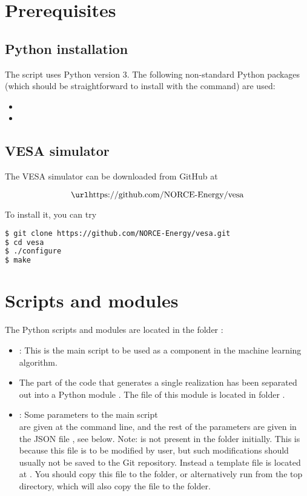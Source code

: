 \documentclass[11pt,a4paper]{amsart}
\begin{document}
\section{Prerequisites}
\subsection{Python installation}
The script uses Python version 3.
The following non-standard Python
packages (which should be straightforward to install with the \pythonPip{} 
\cite{pyt18:pip} command) are used:
\begin{itemize}
\item {}
\item {}
\end{itemize}
\subsection{VESA simulator}
The VESA simulator can be downloaded from GitHub at

\[ \text{\vesaGitHub{}} \]

To install it, you can try
\begin{lstlisting}[language=bash]
$ git clone https://github.com/NORCE-Energy/vesa.git
$ cd vesa
$ ./configure
$ make
\end{lstlisting}


\section{Scripts and modules}
The Python scripts and modules are located in the folder :
\begin{itemize}
\item \mainScriptKJ{} : This is the main script to be used as a component in the
  machine learning algorithm.
\item The part of the code that generates a single realization has been
  separated out into a Python module . The file of
  this module is located in folder .
\item \jsonInputParamFile{} : Some parameters to the main script\\
  \mainScriptKJ{} are given at the command line, and the rest of the
  parameters are given in the JSON file \jsonInputParamFile{}, see
  below. Note: \jsonInputParamFile{} is not present in the  folder
  initially. This is because this file is to be modified by user, but such
  modifications should usually not be saved to the Git repository. Instead a template
  file is located at . You should copy
  this file to the  folder, or alternatively
  run  from the top directory, which will also copy the file
   to the  folder.
\end{itemize}
\end{document}
